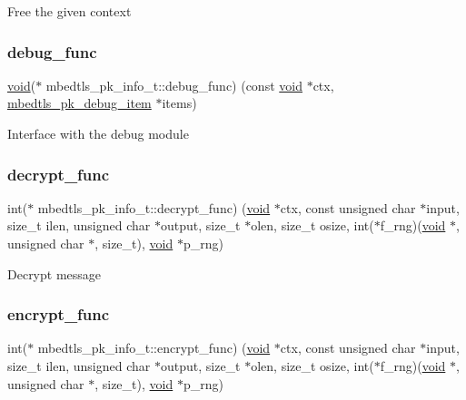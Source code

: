 Free the given context \mbox{\label{structmbedtls__pk__info__t_a61420d1702a434ff7084147cdc86bed3}} 
\subsubsection{\texorpdfstring{debug\+\_\+func}{debug\_func}}
{\footnotesize\ttfamily \hyperlink{interfacevoid}{void}($\ast$ mbedtls\+\_\+pk\+\_\+info\+\_\+t\+::debug\+\_\+func) (const \hyperlink{interfacevoid}{void} $\ast$ctx, \hyperlink{structmbedtls__pk__debug__item}{mbedtls\+\_\+pk\+\_\+debug\+\_\+item} $\ast$items)}

Interface with the debug module \mbox{\label{structmbedtls__pk__info__t_a32ef1fda6aedac78d5a28af612531162}} 
\subsubsection{\texorpdfstring{decrypt\+\_\+func}{decrypt\_func}}
{\footnotesize\ttfamily int($\ast$ mbedtls\+\_\+pk\+\_\+info\+\_\+t\+::decrypt\+\_\+func) (\hyperlink{interfacevoid}{void} $\ast$ctx, const unsigned char $\ast$input, size\+\_\+t ilen, unsigned char $\ast$output, size\+\_\+t $\ast$olen, size\+\_\+t osize, int($\ast$f\+\_\+rng)(\hyperlink{interfacevoid}{void} $\ast$, unsigned char $\ast$, size\+\_\+t), \hyperlink{interfacevoid}{void} $\ast$p\+\_\+rng)}

Decrypt message \mbox{\label{structmbedtls__pk__info__t_ae6aa9a5ebdd68db1fa364d786d9a1118}} 
\subsubsection{\texorpdfstring{encrypt\+\_\+func}{encrypt\_func}}
{\footnotesize\ttfamily int($\ast$ mbedtls\+\_\+pk\+\_\+info\+\_\+t\+::encrypt\+\_\+func) (\hyperlink{interfacevoid}{void} $\ast$ctx, const unsigned char $\ast$input, size\+\_\+t ilen, unsigned char $\ast$output, size\+\_\+t $\ast$olen, size\+\_\+t osize, int($\ast$f\+\_\+rng)(\hyperlink{interfacevoid}{void} $\ast$, unsigned char $\ast$, size\+\_\+t), \hyperlink{interfacevoid}{void} $\ast$p\+\_\+rng)}

